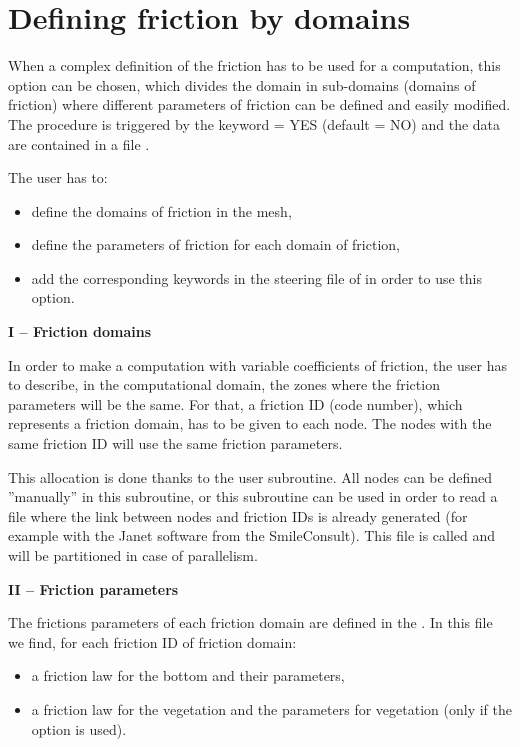 \chapter{Defining friction by domains}
\label{tel2d:app5}
When a complex definition of the friction has to be used for a computation, this
option can be chosen, which divides the domain in sub-domains (domains of friction)
where different parameters of friction can be defined and easily modified.
The procedure is triggered by the keyword  = YES
(default = NO) and the data are contained in a file .

The user has to:

\begin{itemize}
\item  define the domains of friction in the mesh,

\item  define the parameters of friction for each domain of friction,

\item  add the corresponding keywords in the steering file of 
in order to use this option.
\end{itemize}

\textbf{I -- Friction domains}

In order to make a computation with variable coefficients of friction,
the user has to describe, in the computational domain, the zones where the
friction parameters will be the same.
For that, a friction ID (code number), which represents a friction domain, has to be given to
each node.
The nodes with the same friction ID will use the same friction parameters.

This allocation is done thanks to the  user subroutine.
All nodes can be defined ''manually'' in this subroutine, or this subroutine can
be used in order to read a file where the link between nodes and friction IDs is
already generated (for example with the Janet software from the SmileConsult).
This file is called  and will be partitioned in case of
parallelism.

\textbf{II -- Friction parameters}

The frictions parameters of each friction domain are defined in the
.
In this file we find, for each friction ID of friction domain:

\begin{itemize}
\item  a friction law for the bottom and their parameters,

\item  a friction law for the vegetation and the parameters for vegetation (only if the option is used).
\end{itemize}

